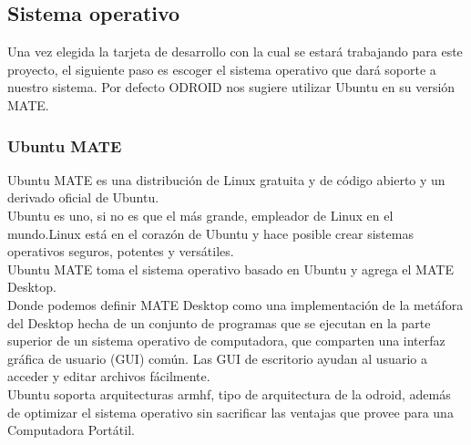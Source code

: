 \subsection{Sistema operativo}
Una vez elegida la tarjeta de desarrollo con la cual se estará trabajando para este
proyecto, el siguiente paso es escoger el sistema operativo que dará soporte a nuestro
sistema. Por defecto ODROID nos sugiere utilizar Ubuntu en su versión MATE.
\subsubsection{Ubuntu MATE}
Ubuntu MATE es una distribución de Linux gratuita y de código abierto y un derivado
oficial de Ubuntu.\\
Ubuntu es uno, si no es que el más grande, empleador de Linux en el mundo.Linux está en el
corazón de Ubuntu y hace posible crear sistemas operativos seguros, potentes y versátiles.\\
Ubuntu MATE toma el sistema operativo basado en Ubuntu y agrega el MATE Desktop.\\
Donde podemos definir MATE Desktop como una implementación de la metáfora del Desktop
hecha de un conjunto de programas que se ejecutan en la parte superior de un sistema
operativo de computadora, que comparten una interfaz gráfica de usuario (GUI) común.
Las GUI de escritorio ayudan al usuario a acceder y editar archivos fácilmente.
~\cite{ubuntu2014}\\
Ubuntu soporta arquitecturas armhf, tipo de arquitectura de la odroid, además de optimizar
el sistema operativo sin sacrificar las ventajas que provee para una Computadora Portátil.
